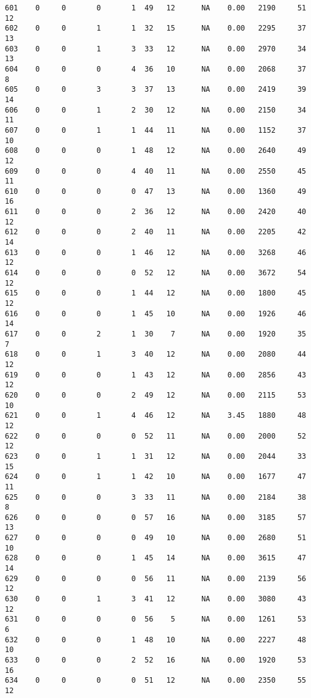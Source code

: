 \documentclass[
  letterpaper,
  DIV=11,
  numbers=noendperiod]{scrreprt}
\begin{document}
\begin{verbatim}
601    0     0       0       1  49   12      NA    0.00   2190     51      12
602    0     0       1       1  32   15      NA    0.00   2295     37      13
603    0     0       1       3  33   12      NA    0.00   2970     34      13
604    0     0       0       4  36   10      NA    0.00   2068     37       8
605    0     0       3       3  37   13      NA    0.00   2419     39      14
606    0     0       1       2  30   12      NA    0.00   2150     34      11
607    0     0       1       1  44   11      NA    0.00   1152     37      10
608    0     0       0       1  48   12      NA    0.00   2640     49      12
609    0     0       0       4  40   11      NA    0.00   2550     45      11
610    0     0       0       0  47   13      NA    0.00   1360     49      16
611    0     0       0       2  36   12      NA    0.00   2420     40      12
612    0     0       0       2  40   11      NA    0.00   2205     42      14
613    0     0       0       1  46   12      NA    0.00   3268     46      12
614    0     0       0       0  52   12      NA    0.00   3672     54      12
615    0     0       0       1  44   12      NA    0.00   1800     45      12
616    0     0       0       1  45   10      NA    0.00   1926     46      14
617    0     0       2       1  30    7      NA    0.00   1920     35       7
618    0     0       1       3  40   12      NA    0.00   2080     44      12
619    0     0       0       1  43   12      NA    0.00   2856     43      12
620    0     0       0       2  49   12      NA    0.00   2115     53      10
621    0     0       1       4  46   12      NA    3.45   1880     48      12
622    0     0       0       0  52   11      NA    0.00   2000     52      12
623    0     0       1       1  31   12      NA    0.00   2044     33      15
624    0     0       1       1  42   10      NA    0.00   1677     47      11
625    0     0       0       3  33   11      NA    0.00   2184     38       8
626    0     0       0       0  57   16      NA    0.00   3185     57      13
627    0     0       0       0  49   10      NA    0.00   2680     51      10
628    0     0       0       1  45   14      NA    0.00   3615     47      14
629    0     0       0       0  56   11      NA    0.00   2139     56      12
630    0     0       1       3  41   12      NA    0.00   3080     43      12
631    0     0       0       0  56    5      NA    0.00   1261     53       6
632    0     0       0       1  48   10      NA    0.00   2227     48      10
633    0     0       0       2  52   16      NA    0.00   1920     53      16
634    0     0       0       0  51   12      NA    0.00   2350     55      12

\end{verbatim}
\end{document}
